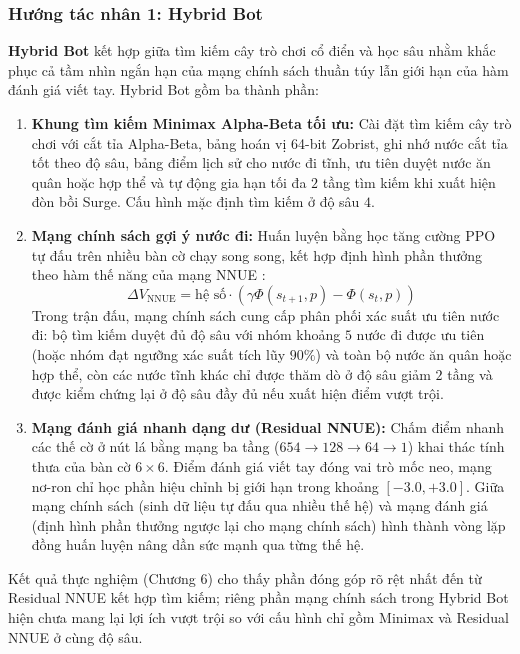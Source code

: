\subsubsection{Hướng tác nhân 1: Hybrid Bot}
\textbf{Hybrid Bot} kết hợp giữa tìm kiếm cây trò chơi cổ điển và học sâu nhằm khắc phục cả tầm nhìn ngắn hạn của mạng chính sách thuần túy lẫn giới hạn của hàm đánh giá viết tay. Hybrid Bot gồm ba thành phần:
\begin{enumerate}
    \item \textbf{Khung tìm kiếm Minimax Alpha-Beta tối ưu:} Cài đặt tìm kiếm cây trò chơi với cắt tỉa Alpha-Beta, bảng hoán vị 64-bit Zobrist, ghi nhớ nước cắt tỉa tốt theo độ sâu, bảng điểm lịch sử cho nước đi tĩnh, ưu tiên duyệt nước ăn quân hoặc hợp thể và tự động gia hạn tối đa $2$ tầng tìm kiếm khi xuất hiện đòn bồi Surge. Cấu hình mặc định tìm kiếm ở độ sâu $4$.
    \item \textbf{Mạng chính sách gợi ý nước đi:} Huấn luyện bằng học tăng cường PPO tự đấu \cite{ppo} trên nhiều bàn cờ chạy song song, kết hợp định hình phần thưởng theo hàm thế năng của mạng NNUE \cite{potential_shaping}:
    \[
        \Delta V_{\text{NNUE}} = \text{hệ số} \cdot \left(\gamma \Phi(s_{t+1}, p) - \Phi(s_t, p)\right)
    \]
    Trong trận đấu, mạng chính sách cung cấp phân phối xác suất ưu tiên nước đi: bộ tìm kiếm duyệt đủ độ sâu với nhóm khoảng $5$ nước đi được ưu tiên (hoặc nhóm đạt ngưỡng xác suất tích lũy $90\%$) và toàn bộ nước ăn quân hoặc hợp thể, còn các nước tĩnh khác chỉ được thăm dò ở độ sâu giảm $2$ tầng và được kiểm chứng lại ở độ sâu đầy đủ nếu xuất hiện điểm vượt trội.
    \item \textbf{Mạng đánh giá nhanh dạng dư (Residual NNUE):} Chấm điểm nhanh các thế cờ ở nút lá bằng mạng ba tầng ($654 \to 128 \to 64 \to 1$) \cite{nnue} khai thác tính thưa của bàn cờ $6 \times 6$. Điểm đánh giá viết tay đóng vai trò mốc neo, mạng nơ-ron chỉ học phần hiệu chỉnh bị giới hạn trong khoảng $[-3.0, +3.0]$. Giữa mạng chính sách (sinh dữ liệu tự đấu qua nhiều thế hệ) và mạng đánh giá (định hình phần thưởng ngược lại cho mạng chính sách) hình thành vòng lặp đồng huấn luyện nâng dần sức mạnh qua từng thế hệ.
\end{enumerate}
Kết quả thực nghiệm (Chương 6) cho thấy phần đóng góp rõ rệt nhất đến từ Residual NNUE kết hợp tìm kiếm; riêng phần mạng chính sách trong Hybrid Bot hiện chưa mang lại lợi ích vượt trội so với cấu hình chỉ gồm Minimax và Residual NNUE ở cùng độ sâu.

